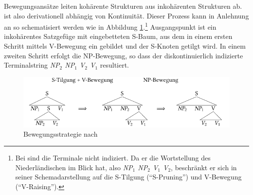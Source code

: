 Bewegungsansätze leiten kohärente Strukturen aus inkohärenten Strukturen ab.  ist also derivationell abhängig von Kontinuität. Dieser Prozess kann in Anlehnung an \citet[(1)]{Evers:75} so schematisiert werden wie in Abbildung \ref{fig-ttmctag-kohaerenz-1}.\footnote{Bei \citet[(1)]{Evers:75} sind die Terminale nicht indiziert. Da er die Wortstellung des Niederländischen im Blick hat, also {\it NP$_1$ NP$_2$ V$_1$ V$_2$}, beschränkt er sich in seiner Schemadarstellung auf die S-Tilgung ("`S-Pruning"') und V-Bewegung ("`V-Raising"').} Ausgangspunkt ist ein inkohärentes Satzgefüge mit eingebetteten S-Baum, aus dem in einem ersten Schritt mittels V-Bewegung ein  gebildet und der S-Knoten getilgt wird. In einem zweiten Schritt erfolgt die NP-Bewegung, so dass der diskontinuierlich indizierte Terminalstring {\it NP$_2$ NP$_1$ V$_2$ V$_1$} resultiert.  

\begin{figure}
\centering
\includegraphics{graphics/abb62.pdf}
\caption{\label{fig-ttmctag-kohaerenz-1}Bewegungsstrategie nach \citet[(1a), (1b)]{Evers:75}}
\end{figure}

